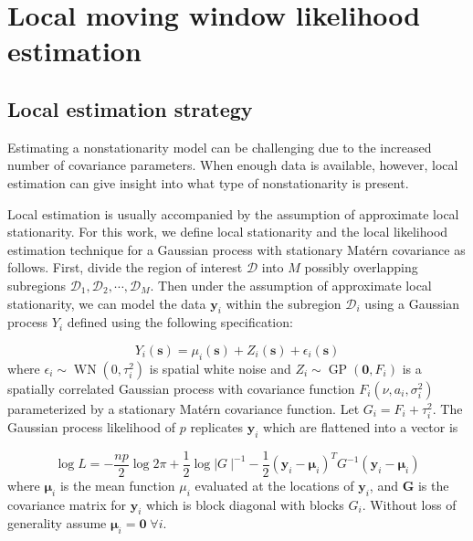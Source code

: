 \documentclass[review]{elsarticle}
\begin{document}
\section{Local moving window likelihood estimation}


\subsection{Local estimation strategy}

Estimating a nonstationarity model can be challenging due to the increased number of covariance parameters. When enough data is available, however, local estimation can give insight into what type of nonstationarity is present.

Local estimation is usually accompanied by the assumption of approximate local stationarity. For this work, we define local stationarity and the local likelihood estimation technique for a Gaussian process with stationary Mat\'ern covariance as follows. First, divide the region of interest $\mathcal{D}$ into $M$ possibly overlapping subregions $\mathcal{D}_1, \mathcal{D}_2, \cdots, \mathcal{D}_M$. Then under the assumption of approximate local stationarity, we can model the data $\mathbf y_i$ within the subregion $\mathcal{D}_i$ using a Gaussian process $Y_i$ defined using the following specification:

\begin{equation}
\label{e:4}
Y_i(\mathbf s) = \mu_i(\mathbf s) + Z_i (\mathbf s) + \epsilon_i (\mathbf s)    
\end{equation}
where $\epsilon_i \sim \operatorname{WN}(0, \tau_i^2)$ is spatial white noise and $Z_i \sim \operatorname{GP}( \mathbf 0, F_i)$ is a spatially correlated Gaussian process with covariance function $F_i(\nu, a_i, \sigma_i^2)$ parameterized by a stationary Mat\'ern covariance function. Let $G_i = F_i + \tau_i^2$. The Gaussian process likelihood of $p$ replicates $\mathbf y_i$ which are flattened into a vector is

\begin{equation}
\label{e:5}
     \log L = - \frac{n p}{2} \log 2 \pi + \frac{1}{2} \log | G \ |^{-1} - \frac{1}{2}(\mathbf y_i - \boldsymbol \mu_i )^T G^{-1} (\mathbf y_i - \boldsymbol \mu_i)
\end{equation}
where $\boldsymbol{\mu}_i$ is the mean function $\mu_i$ evaluated at the locations of $\mathbf y_i$, and $\mathbf G$ is the covariance matrix for $\mathbf y_i$ which is block diagonal with blocks $G_i$. Without loss of generality assume $\boldsymbol \mu _i = \mathbf 0 \; \forall i$.
\end{document}
